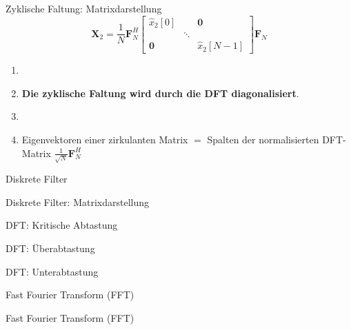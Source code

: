 \documentclass[14pt, aspectratio=169, handout]{beamer}
\begin{document}
\begin{frame}{Zyklische Faltung: Matrixdarstellung}
  $$ \mathbf{X}_2 = \frac{1}{N} \mathbf{F}_N^H  \begin{bmatrix}
        \hat{x}_2[0] & & \mathbf{0} \\
        & \ddots & \\
        \mathbf{0} & & \hat{x}_2[N-1]
    \end{bmatrix}  \mathbf{F}_N $$

    \begin{enumerate}
        \item[]
        \item \textbf{Die zyklische Faltung wird durch die DFT diagonalisiert}.
        \item[] 
        \item Eigenvektoren einer zirkulanten Matrix $=$ Spalten der normalisierten DFT-Matrix $\frac{1}{\sqrt{N}}\mathbf{F}_N^H$
    \end{enumerate}
\end{frame}

\begin{frame}{Diskrete Filter}
    
\end{frame}

\begin{frame}{Diskrete Filter: Matrixdarstellung}
    
\end{frame}

\begin{frame}{DFT: Kritische Abtastung}
    
\end{frame}

\begin{frame}{DFT: Überabtastung}
    
\end{frame}

\begin{frame}{DFT: Unterabtastung}
    
\end{frame}

\begin{frame}{Fast Fourier Transform (FFT)}
    
\end{frame}

\begin{frame}{Fast Fourier Transform (FFT)}
    
\end{frame}
\end{document}
